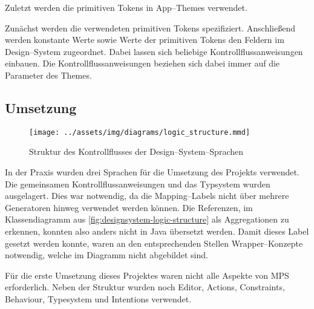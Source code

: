 Zuletzt werden die primitiven Tokens in App--Themes verwendet.

Zunächst werden die verwendeten primitiven Tokens spezifiziert.
Anschließend werden konstante Werte sowie Werte der primitiven Tokens den Feldern im Design--System zugeordnet.
Dabei lassen sich beliebige Kontrollflussanweisungen einbauen.
Die Kontrollflussanweisungen beziehen sich dabei immer auf die Parameter des Themes.

\subsection{Umsetzung}\label{subsec:umsetzung}
\begin{figure}
    \texttt{[image: ../assets/img/diagrams/logic\_structure.mmd]}
    \caption{Struktur des Kontrollflusses der Design--System--Sprachen}
    \label{fig:designsystem-logic-structure}
\end{figure}
In der Praxis wurden drei Sprachen für die Umsetzung des Projekts verwendet.
Die gemeinsamen Kontrollflussanweisungen und das Typsystem wurden ausgelagert.
Dies war notwendig, da die Mapping--Labels nicht über mehrere Generatoren hinweg verwendet werden können.
Die Referenzen, im Klassendiagramm aus \autoref{fig:designsystem-logic-structure} als Aggregationen zu erkennen, konnten also anders nicht in Java übersetzt werden.
Damit dieses Label gesetzt werden konnte, waren an den entsprechenden Stellen Wrapper--Konzepte notwendig, welche im Diagramm nicht abgebildet sind.

Für die erste Umsetzung dieses Projektes waren nicht alle Aspekte von \ac{MPS} erforderlich.
Neben der Struktur wurden noch Editor, Actions, Constraints, Behaviour, Typesystem und Intentions verwendet.

